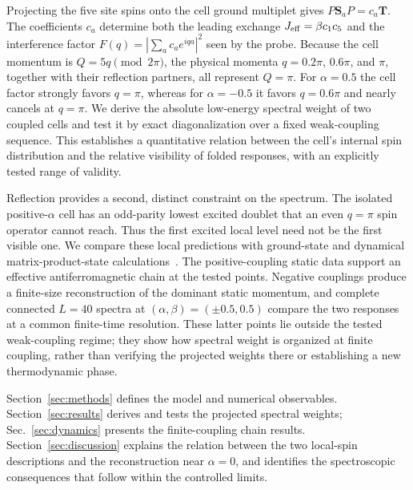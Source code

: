 Projecting the five site spins onto the cell ground multiplet gives
$P\bm S_aP=c_a\bm T$. The coefficients $c_a$ determine both the leading
exchange $J_{\mathrm{eff}}=\beta c_1c_5$ and the interference factor
$F(q)=|\sum_a c_a e^{iqa}|^2$ seen by the probe.
Because the cell momentum is $Q=5q\pmod{2\pi}$, the physical momenta
$q=0.2\pi$, $0.6\pi$, and $\pi$, together with their reflection partners,
all represent $Q=\pi$.
For $\alpha=0.5$ the cell factor strongly favors $q=\pi$, whereas for
$\alpha=-0.5$ it favors $q=0.6\pi$ and nearly cancels at $q=\pi$.
We derive the absolute low-energy spectral weight of two coupled cells and
test it by exact diagonalization over a fixed weak-coupling sequence.
This establishes a quantitative relation between the cell's internal spin
distribution and the relative visibility of folded responses, with an
explicitly tested range of validity.

Reflection provides a second, distinct constraint on the spectrum.
The isolated positive-$\alpha$ cell has an odd-parity lowest excited doublet
that an even $q=\pi$ spin operator cannot reach. Thus the first excited local
level need not be the first visible one.
We compare these local predictions with ground-state and dynamical
matrix-product-state calculations~\cite{white1992,schollwoeck2011,paeckel2019}.
The positive-coupling static data support an effective antiferromagnetic chain
at the tested points. Negative couplings produce a finite-size reconstruction
of the dominant static momentum, and complete connected $L=40$ spectra at
$(\alpha,\beta)=(\pm0.5,0.5)$ compare the two responses at a common
finite-time resolution. These latter points lie outside the tested
weak-coupling regime; they show how spectral weight is organized at finite
coupling, rather than verifying the projected weights there or establishing
a new thermodynamic phase.

Section~\ref{sec:methods} defines the model and numerical observables.
Section~\ref{sec:results} derives and tests the projected spectral weights;
Sec.~\ref{sec:dynamics} presents the finite-coupling chain results.
Section~\ref{sec:discussion} explains the relation between the two local-spin
descriptions and the reconstruction near $\alpha=0$, and identifies the
spectroscopic consequences that follow within the controlled limits.
